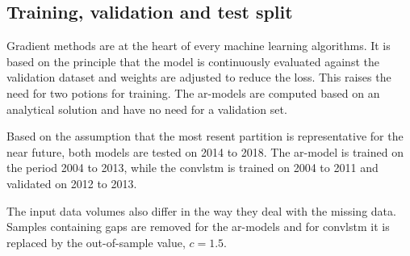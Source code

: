 \subsection{Training, validation and test split}
Gradient methods are at the heart of every machine 
learning algorithms. It is based on the principle that the model is continuously evaluated against the validation dataset and weights are adjusted to reduce the loss. This raises the need for two potions for training. The \acrshort{ar}-models are computed based on an analytical solution and have no need for a validation set. 

Based on the assumption that the most resent partition is representative for the near future, both models are tested on 2014 to 2018. The \acrshort{ar}-model is trained on the period 2004 to 2013, while the \acrshort{convlstm} is trained on  2004 to 2011 and validated on 2012 to 2013.

The input data volumes also differ in the way they deal with the missing data. %
Samples containing gaps are removed for the \acrshort{ar}-models and for \acrshort{convlstm} it is replaced by the out-of-sample value, $c=1.5$. 


